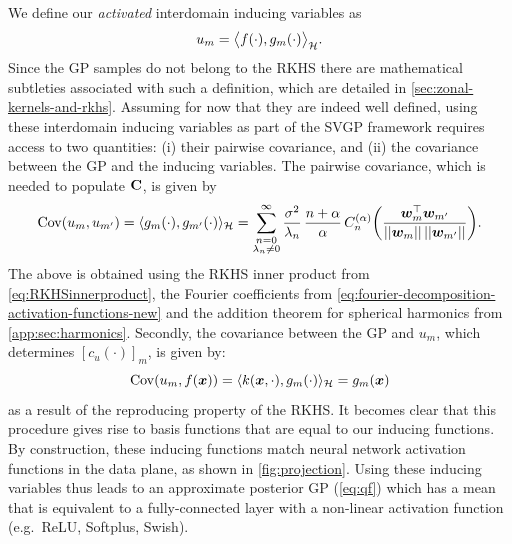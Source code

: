 We define our \emph{activated} interdomain inducing variables as
\begin{equation}
\label{eq:def-inducing-variable}
    u_m = \big\langle f(\cdot), {g}_m(\cdot) \big\rangle_{{\mathcal{H}}}.
\end{equation}
Since the GP samples do not belong to the RKHS there are mathematical subtleties associated with such a definition, which are detailed in \cref{sec:zonal-kernels-and-rkhs}. Assuming for now that they are indeed well defined, using these interdomain inducing variables as part of the SVGP framework requires access to two quantities: (i) their pairwise covariance, and (ii) the covariance between the GP and the inducing variables. The pairwise covariance, which is needed to populate $\mathbf{{C}}$, is given by
\begin{equation}
\label{eq:kuu}
\Cov(u_{m}, u_{m'})
= \langle {g}_m(\cdot), {g}_{m'}(\cdot) \rangle_\rkhs
= \sum_{\substack{n=0 \\ \lambda_n \neq 0}}^{\infty}
    \frac{\sigma^2}{\lambda_n}\,\frac{n + \alpha}{\alpha}\,C_n^{(\alpha)}\left(\frac{\vw_m^\top \vw_{m'}}{\norm{\vw_m}\,\norm{\vw_{m'}}}\right).  
\end{equation}
The above is obtained using the RKHS inner product from \cref{eq:RKHSinnerproduct}, the Fourier coefficients from \cref{eq:fourier-decomposition-activation-functions-new} and the addition theorem for spherical harmonics from \cref{app:sec:harmonics}. Secondly, the covariance between the GP and $u_m$, which determines $[c_u(\cdot)]_m$, is given by:
\begin{equation}
\label{eq:kuf}
  \mathrm{Cov}(u_m, f(\bm{x})) = 
    \langle k(\bm{x}, \cdot), {g}_m(\cdot) \rangle_{{\mathcal{H}}} = {g}_m(\bm{x}) 
\end{equation}
as a result of the reproducing property of the RKHS. It becomes clear that this procedure gives rise to basis functions that are equal to our inducing functions. By construction, these inducing functions match neural network activation functions in the data plane, as shown in \cref{fig:projection}. Using these inducing variables thus leads to an approximate posterior GP (\cref{eq:qf}) which has a mean that is equivalent to a fully-connected layer with a non-linear activation function (e.g.~ReLU, Softplus, Swish). 


